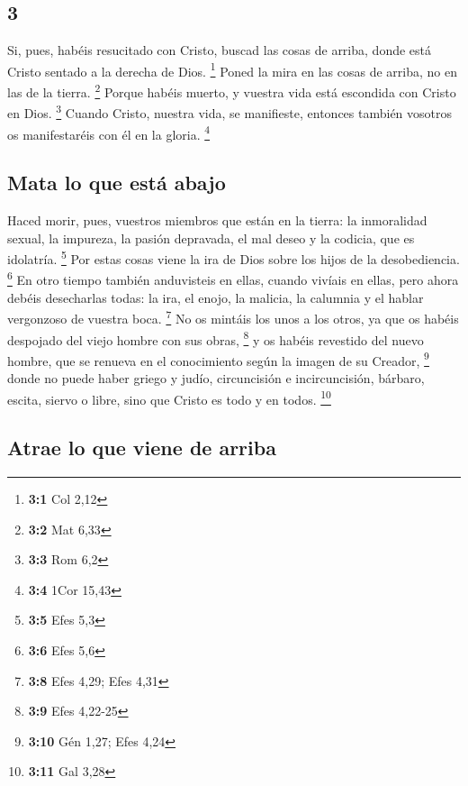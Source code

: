 \begin{paracol}{2}
{\section{3}\label{section-4}}

 Si, pues, habéis resucitado con Cristo, buscad las cosas
de arriba, donde está Cristo sentado a la derecha de Dios. \footnote{\textbf{3:1}
  Col 2,12}  Poned la mira en las cosas de arriba, no en
las de la tierra. \footnote{\textbf{3:2} Mat 6,33}  Porque
habéis muerto, y vuestra vida está escondida con Cristo en Dios.
\footnote{\textbf{3:3} Rom 6,2}  Cuando Cristo, nuestra
vida, se manifieste, entonces también vosotros os manifestaréis con él
en la gloria. \footnote{\textbf{3:4} 1Cor 15,43}

\hypertarget{mata-lo-que-estuxe1-abajo}{%
\subsection{Mata lo que está abajo}\label{mata-lo-que-estuxe1-abajo}}

 Haced morir, pues, vuestros miembros que están en la
tierra: la inmoralidad sexual, la impureza, la pasión depravada, el mal
deseo y la codicia, que es idolatría. \footnote{\textbf{3:5} Efes 5,3}
 Por estas cosas viene la ira de Dios sobre los hijos de
la desobediencia. \footnote{\textbf{3:6} Efes 5,6}  En
otro tiempo también anduvisteis en ellas, cuando vivíais en ellas,
 pero ahora debéis desecharlas todas: la ira, el enojo, la
malicia, la calumnia y el hablar vergonzoso de vuestra boca. \footnote{\textbf{3:8}
  Efes 4,29; Efes 4,31}  No os mintáis los unos a los
otros, ya que os habéis despojado del viejo hombre con sus obras,
\footnote{\textbf{3:9} Efes 4,22-25}  y os habéis
revestido del nuevo hombre, que se renueva en el conocimiento según la
imagen de su Creador, \footnote{\textbf{3:10} Gén 1,27; Efes 4,24}
 donde no puede haber griego y judío, circuncisión e
incircuncisión, bárbaro, escita, siervo o libre, sino que Cristo es todo
y en todos. \footnote{\textbf{3:11} Gal 3,28}

\hypertarget{atrae-lo-que-viene-de-arriba}{%
\subsection{Atrae lo que viene de
arriba}\label{atrae-lo-que-viene-de-arriba}}


\end{paracol}
